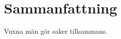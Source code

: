 \thispagestyle{plain}			%
\section*{Sammanfattning}
Vuxna män gör saker tillsammans.

\newpage				%
\thispagestyle{empty}
\mbox{}
